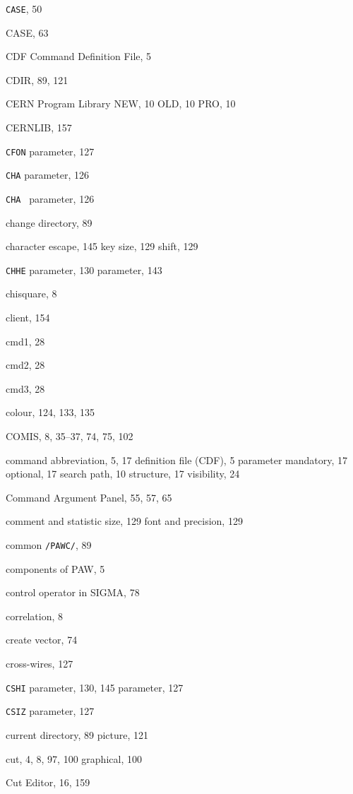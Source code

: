 \begin{theindex}
  \item {\tt CASE}, 50
  \item {\ttfamily  CASE}, 63
  \item CDF Command Definition File, 5
  \item {\ttfamily  CDIR}, 89, 121
  \item CERN Program Library
    \subitem NEW, 10
    \subitem OLD, 10
    \subitem PRO, 10
  \item CERNLIB, 157
  \item {\tt CFON}
     parameter, 127
  \item {\tt CHA}
     parameter, 126
  \item {\tt CHA }
     parameter, 126
  \item change directory, 89
  \item character
    \subitem escape, 145
    \subitem key size, 129
    \subitem shift, 129
  \item {\tt CHHE}
     parameter, 130
     parameter, 143
  \item chisquare, 8
  \item client, 154
  \item {\ttfamily  cmd1}, 28
  \item {\ttfamily  cmd2}, 28
  \item {\ttfamily  cmd3}, 28
  \item colour, 124, 133, 135
  \item COMIS, 8, 35--37, 74, 75, 102
  \item command
    \subitem abbreviation, 5, 17
    \subitem definition file (CDF), 5
    \subitem parameter
      \subsubitem mandatory, 17
      \subsubitem optional, 17
    \subitem search path, 10
    \subitem structure, 17
    \subitem visibility, 24
  \item Command Argument Panel, 55, 57, 65
  \item comment
    \subitem and statistic size, 129
    \subitem font and precision, 129
  \item common {\tt/PAWC/}, 89
  \item components
    \subitem of PAW, 5
  \item control operator in SIGMA, 78
  \item correlation, 8
  \item create
    \subitem vector, 74
  \item cross-wires, 127
  \item {\tt CSHI}
     parameter, 130, 145
     parameter, 127
  \item {\tt CSIZ}
     parameter, 127
  \item current
    \subitem directory, 89
    \subitem picture, 121
  \item cut, 4, 8, 97, 100
    \subitem graphical, 100
  \item Cut Editor, 16, 159


\end{theindex}
